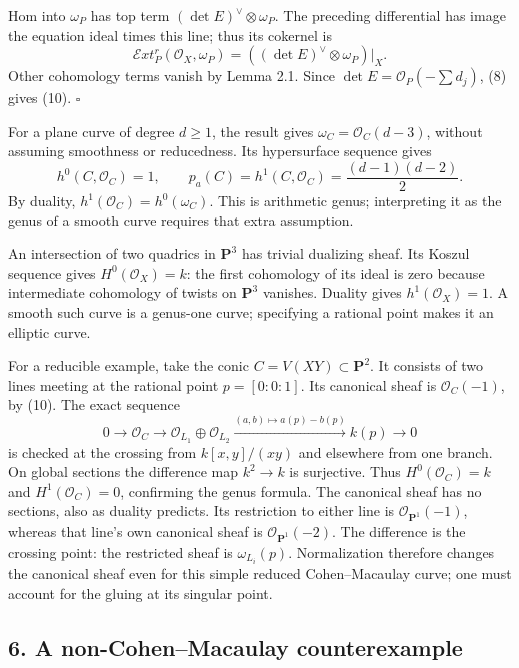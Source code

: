 \documentclass[11pt]{article}
\begin{document}
Hom into \(\omega_P\) has top term \((\det E)^\vee\otimes\omega_P\). The
preceding differential has image the equation ideal times this line;
thus its cokernel is \[
\mathcal E xt^r_P(\mathcal O_X,\omega_P)
 =((\det E)^\vee\otimes\omega_P)|_X.
\] Other cohomology terms vanish by Lemma 2.1. Since
\(\det E=\mathcal O_P(-\sum d_j)\), (8) gives (10). \(\square\)

For a plane curve of degree \(d\geq1\), the result gives
\(\omega_C=\mathcal O_C(d-3)\), without assuming smoothness or
reducedness. Its hypersurface sequence gives \[
h^0(C,\mathcal O_C)=1,
\qquad p_a(C)=h^1(C,\mathcal O_C)=\frac{(d-1)(d-2)}2.
\] By duality, \(h^1(\mathcal O_C)=h^0(\omega_C)\). This is arithmetic
genus; interpreting it as the genus of a smooth curve requires that
extra assumption.

An intersection of two quadrics in \(\mathbf P^3\) has trivial dualizing
sheaf. Its Koszul sequence gives \(H^0(\mathcal O_X)=k\): the first
cohomology of its ideal is zero because intermediate cohomology of
twists on \(\mathbf P^3\) vanishes. Duality gives
\(h^1(\mathcal O_X)=1\). A smooth such curve is a genus-one curve;
specifying a rational point makes it an elliptic curve.

For a reducible example, take the conic \(C=V(XY)\subset\mathbf P^2\).
It consists of two lines meeting at the rational point \(p=[0:0:1]\).
Its canonical sheaf is \(\mathcal O_C(-1)\), by (10). The exact sequence
\[
0\to\mathcal O_C\to\mathcal O_{L_1}\oplus\mathcal O_{L_2}
 \xrightarrow{(a,b)\mapsto a(p)-b(p)}k(p)\to0
\] is checked at the crossing from \(k[x,y]/(xy)\) and elsewhere from
one branch. On global sections the difference map \(k^2\to k\) is
surjective. Thus \(H^0(\mathcal O_C)=k\) and \(H^1(\mathcal O_C)=0\),
confirming the genus formula. The canonical sheaf has no sections, also
as duality predicts. Its restriction to either line is
\(\mathcal O_{\mathbf P^1}(-1)\), whereas that line's own canonical
sheaf is \(\mathcal O_{\mathbf P^1}(-2)\). The difference is the
crossing point: the restricted sheaf is \(\omega_{L_i}(p)\).
Normalization therefore changes the canonical sheaf even for this simple
reduced Cohen--Macaulay curve; one must account for the gluing at its
singular point.

\subsection{6. A non-Cohen--Macaulay
counterexample}\label{a-non-cohenmacaulay-counterexample}
\end{document}
